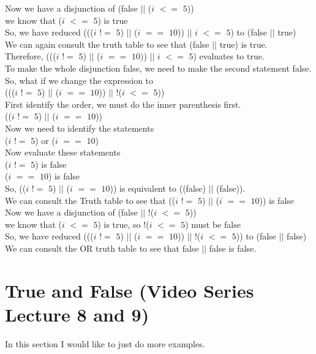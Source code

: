 \documentclass[11]{article}
\begin{document}
 Now we have a disjunction of (false $||$ ($i$ $<=$ $5$))\\
 we know that ($i$ $<=$ $5$) is true \\
 So, we have reduced ((($i$ $!=$ $5$) $||$ ($i$ $==$ $10$)) $||$ $i$ $<=$ $5$) to (false $||$ true)\\
 We can again consult the truth table to see that (false $||$ true) is true.\\
 
 Therefore, ((($i$ $!=$ $5$) $||$ ($i$ $==$ $10$)) $||$ $i$ $<=$ $5$) evaluates to true.\\
 
 To make the whole disjunction false, we need to make the second statement false. So, what if we change the expression to \\
 ((($i$ $!=$ $5$) $||$ ($i$ $==$ $10$)) $||$ !($i$ $<=$ $5$))\\
 
 First identify the order, we must do the inner parenthesis first.\\
(($i$ $!=$ $5$) $||$ ($i$ $==$ $10$))\\
Now we need to identify the statements\\
($i$ $!=$ $5$) or ($i$ $==$ $10$) \\
Now evaluate these statements \\
($i$ $!=$ $5$) is false\\
 ($i$ $==$ $10$) is false \\
 So, (($i$ $!=$ $5$) $||$ ($i$ $==$ $10$)) is equivalent to ((false) $||$ (false)).\\
 We can consult the Truth table to see that (($i$ $!=$ $5$) $||$ ($i$ $==$ $10$)) is false\\
 
 Now we have a disjunction of (false $||$ !($i$ $<=$ $5$))\\
 we know that ($i$ $<=$ $5$) is true, so   !($i$ $<=$ $5$) must be false\\
 So, we have reduced ((($i$ $!=$ $5$) $||$ ($i$ $==$ $10$)) $||$ !($i$ $<=$ $5$)) to (false $||$ false)\\
 
 We can consult the OR truth table to see that false $||$ false is false.

\section{True and False (Video Series Lecture 8 and 9)}
In this section I would like to just do more examples.
\end{document}
